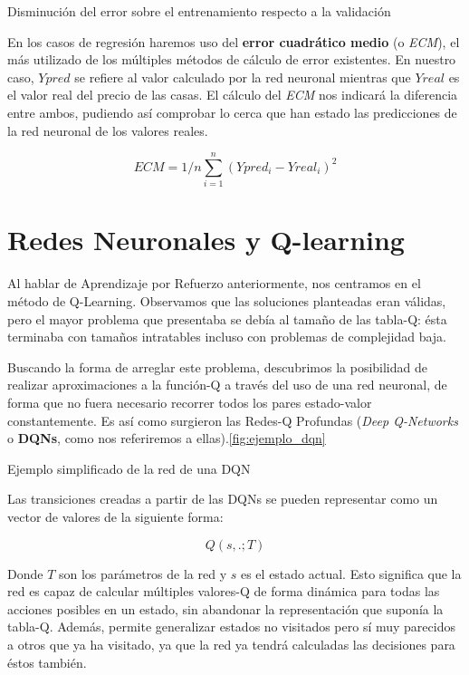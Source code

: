 %
       {Disminución del error sobre el entrenamiento respecto a la validación} 

En los casos de regresión haremos uso del \textbf{error cuadrático medio} (o \textit{ECM}), el más utilizado de los múltiples métodos de cálculo de error existentes. En nuestro caso, $Ypred$ se refiere al valor calculado por la red neuronal mientras que $Yreal$ es el valor real del precio de las casas. El cálculo del \textit{ECM} nos indicará la diferencia entre ambos, pudiendo así comprobar lo cerca que han estado las predicciones de la red neuronal de los valores reales.

$$ECM = 1/n \sum^n_{i=1}(Ypred_i - Yreal_i)^2$$


\section{Redes Neuronales y Q-learning}

Al hablar de Aprendizaje por Refuerzo anteriormente, nos centramos en el método de Q-Learning. Observamos que las soluciones planteadas eran válidas, pero el mayor problema que presentaba se debía al tamaño de las tabla-Q: ésta terminaba con tamaños intratables incluso con problemas de complejidad baja. 

Buscando la forma de arreglar este problema, descubrimos la posibilidad de realizar aproximaciones a la función-Q a través del uso de una red neuronal, de forma que no fuera necesario recorrer todos los pares estado-valor constantemente. Es así como surgieron las Redes-Q Profundas (\textit{Deep Q-Networks} o \textbf{DQNs}, como nos referiremos a ellas).\ref{fig:ejemplo_dqn} 

%
       {Ejemplo simplificado de la red de una DQN}

Las transiciones creadas a partir de las DQNs se pueden representar como un vector de valores de la siguiente forma: 

$$Q(s, . ; T )$$ 

Donde $T$ son los parámetros de la red y $s$ es el estado actual. Esto significa que la red es capaz de calcular múltiples valores-Q de forma dinámica para todas las acciones posibles en un estado, sin abandonar la representación que suponía la tabla-Q. Además, permite generalizar estados no visitados pero sí muy parecidos a otros que ya ha visitado, ya que la red ya tendrá calculadas las decisiones para éstos también.


